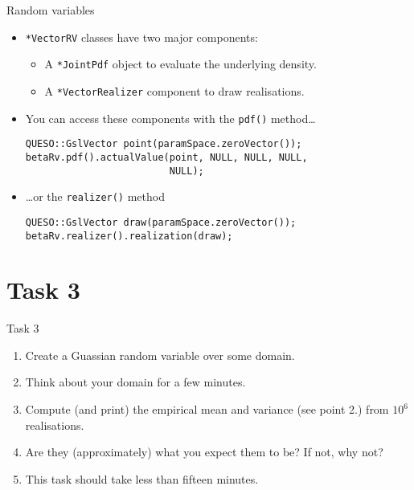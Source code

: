 \begin{frame}[fragile]{Random variables}
  \begin{itemize}
    \item \texttt{*VectorRV} classes have two major components:
      \begin{itemize}
        \item A \texttt{*JointPdf} object to evaluate the underlying density.
        \item A \texttt{*VectorRealizer} component to draw realisations.
      \end{itemize}
    \item You can access these components with the \texttt{pdf()} method\ldots
      \begin{verbatim}
QUESO::GslVector point(paramSpace.zeroVector());
betaRv.pdf().actualValue(point, NULL, NULL, NULL,
                         NULL); \end{verbatim}
    \item \ldots or the \texttt{realizer()} method
      \begin{verbatim}
QUESO::GslVector draw(paramSpace.zeroVector());
betaRv.realizer().realization(draw); \end{verbatim}
  \end{itemize}
\end{frame}

\section{Task 3}
\begin{frame}[fragile]{Task 3}
  \begin{enumerate}
    \item Create a Guassian random variable over some domain.
    \item Think about your domain for a few minutes.
    \item Compute (and print) the empirical mean and variance (see point 2.)
      from $10^6$ realisations.
    \item Are they (approximately) what you expect them to be?  If not, why
      not?
    \item This task should take less than fifteen minutes.
  \end{enumerate}
\end{frame}
